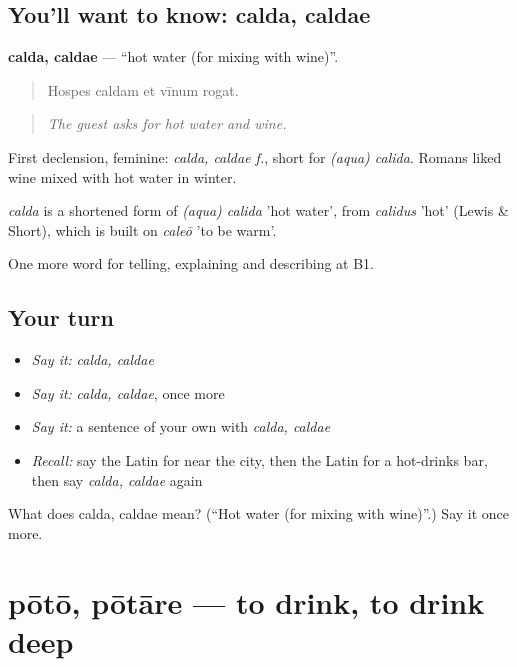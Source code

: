 \subsection*{You'll want to know: calda, caldae}
\textbf{calda, caldae} — \textquotedblleft{}hot water (for mixing with wine)\textquotedblright{}.

\begin{quote}
Hospes caldam et vīnum rogat.
\end{quote}

\begin{quote}
\emph{The guest asks for hot water and wine.}
\end{quote}

First declension, feminine: \emph{calda, caldae f.}, short for \emph{(aqua) calida}. Romans liked wine mixed with hot water in winter.

\begin{cousinweb}
\emph{calda} is a shortened form of \emph{(aqua) calida} 'hot water', from \emph{calidus} 'hot' (Lewis \& Short), which is built on \emph{caleō} 'to be warm'.
\end{cousinweb}

\begin{grammarlens}[title={What you've built}]
One more word for telling, explaining and describing at B1.
\end{grammarlens}

\subsection*{Your turn}
\begin{itemize}
\raggedright
  \item \emph{Say it:} \emph{calda, caldae}
  \item \emph{Say it:} \emph{calda, caldae}, once more
  \item \emph{Say it:} a sentence of your own with \emph{calda, caldae}
  \item \emph{Recall:} say the Latin for near the city, then the Latin for a hot-drinks bar, then say \emph{calda, caldae} again
\end{itemize}

\begin{tcolorbox}[breakable,colback=teal!4,colframe=teal!35!black,title={Before you move on}]
What does calda, caldae mean? (\textquotedblleft{}Hot water (for mixing with wine)\textquotedblright{}.) Say it once more.
\end{tcolorbox}
\section[pōtō, pōtāre]{pōtō, pōtāre — to drink, to drink deep}

